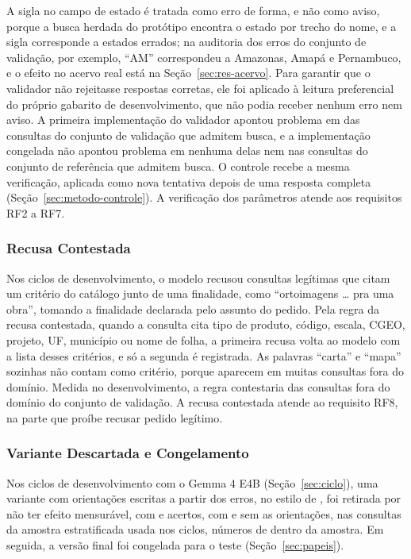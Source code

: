 A sigla no campo de estado é tratada como erro de forma, e não como aviso, porque a busca herdada do protótipo encontra o estado por trecho do nome, e a sigla corresponde a estados errados; na auditoria dos erros do conjunto de validação, por exemplo, ``AM'' correspondeu a Amazonas, Amapá e Pernambuco, e o efeito no acervo real está na Seção~\ref{sec:res-acervo}. Para garantir que o validador não rejeitasse respostas corretas, ele foi aplicado à leitura preferencial do próprio gabarito de desenvolvimento, que não podia receber nenhum erro nem aviso. A primeira implementação do validador apontou problema em  das  consultas do conjunto de validação que admitem busca, e a implementação congelada não apontou problema em nenhuma delas nem nas  consultas do conjunto de referência que admitem busca. O controle recebe a mesma verificação, aplicada como nova tentativa depois de uma resposta completa (Seção~\ref{sec:metodo-controle}). A verificação dos parâmetros atende aos requisitos RF2 a RF7.

\subsubsection{Recusa Contestada}
\label{sec:recusa-contestada}

Nos ciclos de desenvolvimento, o modelo recusou consultas legítimas que citam um critério do catálogo junto de uma finalidade, como ``ortoimagens \ldots{} pra uma obra'', tomando a finalidade declarada pelo assunto do pedido. Pela regra da recusa contestada, quando a consulta cita tipo de produto, código, escala, CGEO, projeto, UF, município ou nome de folha, a primeira recusa volta ao modelo com a lista desses critérios, e só a segunda é registrada. As palavras ``carta'' e ``mapa'' sozinhas não contam como critério, porque aparecem em muitas consultas fora do domínio. Medida no desenvolvimento, a regra contestaria  das  consultas fora do domínio do conjunto de validação. A recusa contestada atende ao requisito RF8, na parte que proíbe recusar pedido legítimo.

\subsubsection{Variante Descartada e Congelamento}
\label{sec:congelamento}

Nos ciclos de desenvolvimento com o Gemma 4 E4B (Seção~\ref{sec:ciclo}), uma variante com orientações escritas a partir dos erros, no estilo de , foi retirada por não ter efeito mensurável, com  e  acertos, com e sem as orientações, nas  consultas da amostra estratificada usada nos ciclos, números de dentro da amostra. Em seguida, a versão final foi congelada para o teste (Seção~\ref{sec:papeis}).


